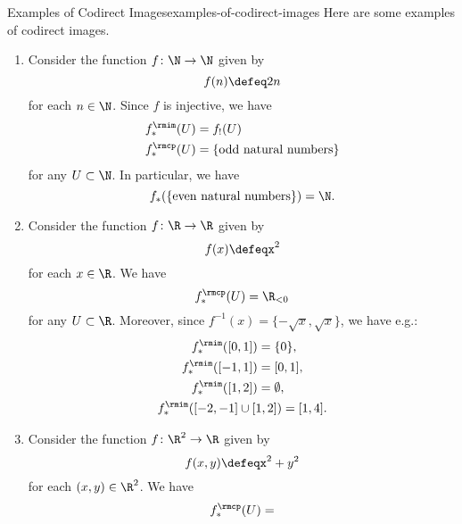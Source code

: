 \begin{example}{Examples of Codirect Images}{examples-of-codirect-images}%
    Here are some examples of codirect images.
    \begin{enumerate}
        \item\label{examples-of-codirect-images-multiplication-by-two}Consider the function $f\colon\N\to\N$ given by
            \[
                f(n)
                \defeq
                2n
            \]%
            for each $n\in\N$. Since $f$ is injective, we have
            \begin{align*}
                f^{\rmim}_{*}(U) &= f_{!}(U)\\
                f^{\rmcp}_{*}(U) &= \{\text{odd natural numbers}\}
            \end{align*}
            for any $U\subset\N$. In particular, we have
            \[
                f_{*}(\{\text{even natural numbers}\})%
                =%
                \N.%
            \]%
        \item\label{examples-of-codirect-images-parabolas}Consider the function $f\colon\R\to\R$ given by
            \[
                f(x)%
                \defeq%
                x^{2}
            \]%
            for each $x\in\R$. We have
            \[
                f^{\rmcp}_{*}(U)%
                =%
                \R_{<0}
            \]%
            for any $U\subset\R$. Moreover, since $f^{-1}(x)=\{-\sqrt{x},\sqrt{x}\}$, we have e.g.:
            \begin{gather*}
                \begin{aligned}
                    f^{\rmim}_{*}([0,1])        &= \{0\},\\
                    f^{\rmim}_{*}([-1,1])       &= [0,1],\\
                    f^{\rmim}_{*}([1,2])        &= \emptyset,
                \end{aligned}
                \\
                f^{\rmim}_{*}([-2,-1]\cup[1,2])  = [1,4].
            \end{gather*}
        \item\label{examples-of-codirect-images-circles}Consider the function $f\colon\R^{2}\to\R$ given by
            \[
                f(x,y)%
                \defeq%
                x^{2}+y^{2}
            \]%
            for each $(x,y)\in\R^{2}$. We have
            \[
                f^{\rmcp}_{*}(U)%
                =%
\]
\end{enumerate}
\end{example}
